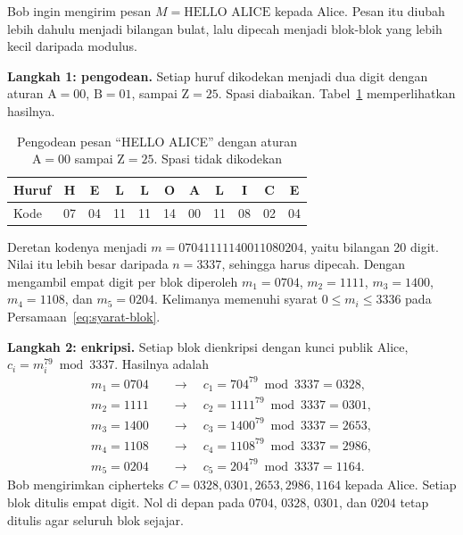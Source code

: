 \begin{example}
\label{ex:rsa-hello-alice}
Bob ingin mengirim pesan $M = \text{HELLO ALICE}$ kepada Alice. Pesan itu
diubah lebih dahulu menjadi bilangan bulat, lalu dipecah menjadi blok-blok
yang lebih kecil daripada modulus.

\textbf{Langkah 1: pengodean.} Setiap huruf dikodekan menjadi dua digit dengan
aturan $\text{A} = 00$, $\text{B} = 01$, sampai $\text{Z} = 25$. Spasi
diabaikan. Tabel~\ref{tab:pengodean-hello} memperlihatkan hasilnya.

\begin{table}[htbp]
    \centering
    \begin{tabular}{@{}l *{10}{c}@{}}
    \toprule
    Huruf & H & E & L & L & O & A & L & I & C & E \\
    \midrule
    Kode & 07 & 04 & 11 & 11 & 14 & 00 & 11 & 08 & 02 & 04 \\
    \bottomrule
    \end{tabular}
    \caption{Pengodean pesan ``HELLO ALICE'' dengan aturan $\text{A}=00$ sampai
    $\text{Z}=25$. Spasi tidak dikodekan}
    \label{tab:pengodean-hello}
\end{table}

Deretan kodenya menjadi $m = 07041111140011080204$, yaitu bilangan 20 digit.
Nilai itu lebih besar daripada $n = 3337$, sehingga harus dipecah. Dengan
mengambil empat digit per blok diperoleh $m_1 = 0704$, $m_2 = 1111$,
$m_3 = 1400$, $m_4 = 1108$, dan $m_5 = 0204$. Kelimanya memenuhi syarat
$0 \le m_i \le 3336$ pada Persamaan~\eqref{eq:syarat-blok}.

\textbf{Langkah 2: enkripsi.} Setiap blok dienkripsi dengan kunci publik Alice,
$c_i = m_i^{79} \bmod 3337$. Hasilnya adalah
\[
\begin{aligned}
m_1 = 0704 &\quad\longrightarrow\quad c_1 = 704^{79} \bmod 3337 = 0328, \\
m_2 = 1111 &\quad\longrightarrow\quad c_2 = 1111^{79} \bmod 3337 = 0301, \\
m_3 = 1400 &\quad\longrightarrow\quad c_3 = 1400^{79} \bmod 3337 = 2653, \\
m_4 = 1108 &\quad\longrightarrow\quad c_4 = 1108^{79} \bmod 3337 = 2986, \\
m_5 = 0204 &\quad\longrightarrow\quad c_5 = 204^{79} \bmod 3337 = 1164.
\end{aligned}
\]
Bob mengirimkan cipherteks $C = 0328, 0301, 2653, 2986, 1164$ kepada Alice.
Setiap blok ditulis empat digit. Nol di depan pada $0704$, $0328$, $0301$, dan
$0204$ tetap ditulis agar seluruh blok sejajar.


\end{example}
